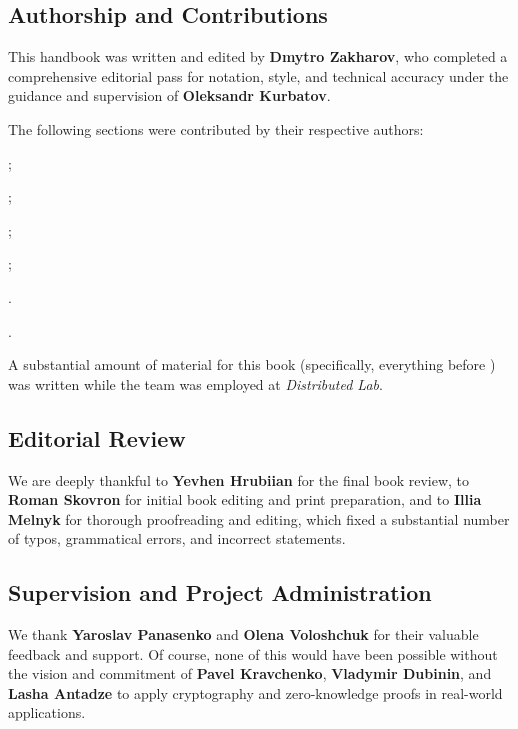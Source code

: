 \documentclass[../../book.tex]{subfiles}
\begin{document}
\subsection*{Authorship and Contributions} 
This handbook was written and edited by \textbf{Dmytro Zakharov}, who completed a comprehensive editorial pass for notation, style, and technical accuracy under the guidance and supervision of \textbf{Oleksandr Kurbatov}.

The following sections were contributed by their respective authors:
\begin{description}[font=\bfseries, labelwidth=3.2cm, leftmargin=3.4cm, align=left]
    \item[Anton Levochko] ;
    \item[Yevhen Hrubiian] ;
    \item[Nikita Masych] ;
    \item[Denis Riabtsev] ;
    \item[Kyrylo Riabov] .
    \item[Illia Melnyk] .
\end{description}

A substantial amount of material for this book (specifically, everything before ) was written while the team was employed at \textit{Distributed Lab}.

\subsection*{Editorial Review} 
We are deeply thankful to \textbf{Yevhen Hrubiian} for the final book review,
to \textbf{Roman Skovron} for initial book editing and print preparation,
and to \textbf{Illia Melnyk} for thorough proofreading and editing, which fixed a substantial number of typos, grammatical errors, and incorrect statements.

\subsection*{Supervision and Project Administration} 
We thank \textbf{Yaroslav Panasenko} and \textbf{Olena Voloshchuk} for their valuable feedback and support.
Of course, none of this would have been possible without the vision and commitment of \textbf{Pavel Kravchenko}, \textbf{Vladymir Dubinin}, and \textbf{Lasha Antadze} to apply cryptography and zero-knowledge proofs in real-world applications.
\end{document}
